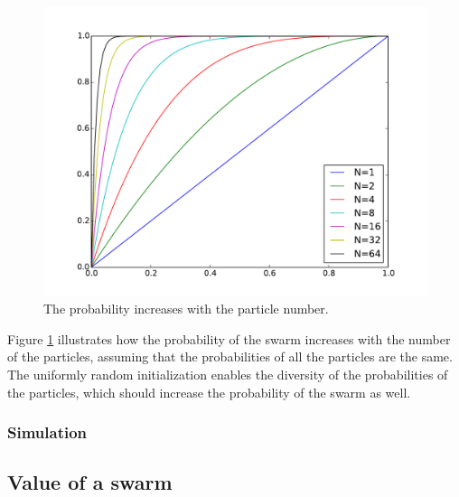 \begin{figure}
\centering
\includegraphics[width=0.7\linewidth]{./fig/probRise}
\caption{The probability increases with the particle number.}
\label{fig:probRise}
\end{figure}

Figure \ref{fig:probRise} illustrates how the probability of the swarm increases with the number of the particles, assuming that the probabilities of all the particles are the same.
The uniformly random initialization enables the diversity of the probabilities of the particles, which should increase the probability of the swarm as well.


\subsubsection{Simulation}

\subsection{Value of a swarm}


